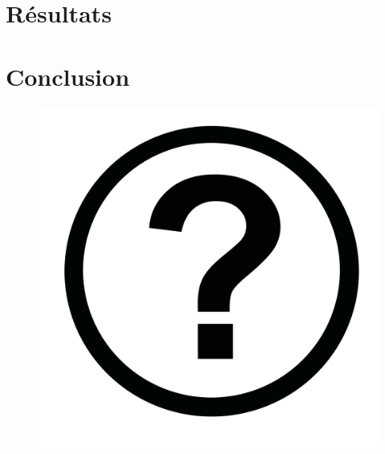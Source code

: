 \documentclass[pdf,11pt,xcolor=dvipsnames]{beamer}
\begin{document}
\section{Résultats}
\section{Conclusion}

% 
% 
\begin{frame}{}
  \begin{figure}
    \begin{centering}
      \includegraphics[scale=0.1]{img/Icon-round-Question_mark.jpg}
      \par\end{centering}
  \end{figure}
\end{frame}
\end{document}
